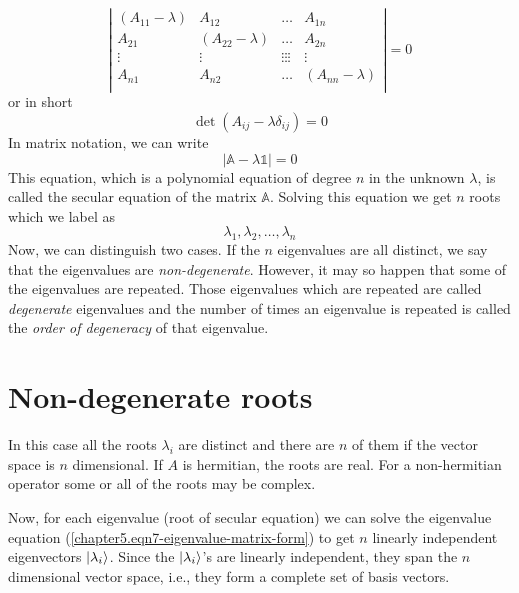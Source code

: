 \begin{equation}
	\left|
	\begin{matrix}
		(A_{11}-\lambda) & A_{12} & \ldots & A_{1n} \\
		A_{21} & (A_{22}-\lambda) & \ldots & A_{2n} \\
		\vdots & \vdots & \vdots \vdots \vdots & \vdots \\
		A_{n1} & A_{n2} & \ldots & (A_{nn}-\lambda) \\
	\end{matrix}
	\right| = 0
\end{equation}
	or in short
	\begin{equation}
		\det(A_{ij} - \lambda \delta_{ij}) = 0
	\end{equation}
	In matrix notation, we can write
	\begin{equation}
		\left|\mathbb{A} - \lambda \mathbb{1} \right| = 0
	\end{equation}
	This equation, which is a polynomial equation of degree $n$ in the unknown $\lambda$, is called the secular equation of the matrix $\mathbb{A}$. Solving this equation we get $n$ roots which we label as 
	\begin{equation}
		\lambda_1, \lambda_2, \ldots, \lambda_n \nonumber
	\end{equation}
	Now, we can distinguish two cases. If the $n$ eigenvalues are all distinct, we say that the eigenvalues are \textit{non-degenerate}. However, it may so happen that some of the eigenvalues are repeated. Those eigenvalues which are repeated are called \textit{degenerate}
	eigenvalues and the number of times an eigenvalue is repeated is called the \textit{order of degeneracy} of that eigenvalue.
	
	\section{Non-degenerate roots}
	In this case all the roots $\lambda_i$ are distinct and there are $n$ of them if the vector space is $n$ dimensional. If $A$ is hermitian, the roots are real. For a non-hermitian operator some or all of the roots may be complex.
	
	
	Now, for each eigenvalue (root of secular equation) we can solve the eigenvalue equation (\ref{chapter5.eqn7-eigenvalue-matrix-form}) to get $n$ linearly independent eigenvectors $\ket{\lambda_i}$. Since the $\ket{\lambda_i}$'s are linearly independent, they span the $n$ dimensional vector space, i.e., they form a complete set of basis vectors.
	
